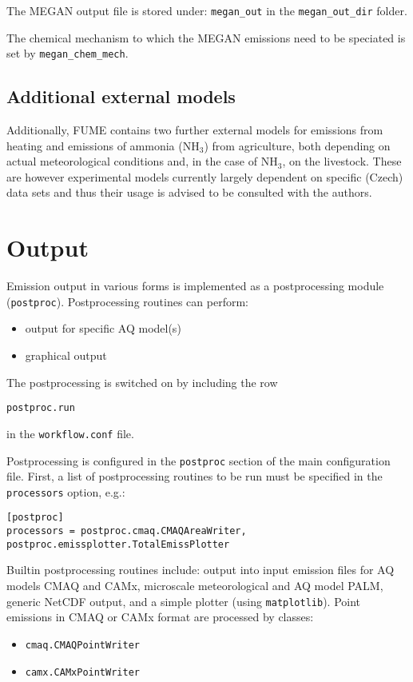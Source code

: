 \documentclass[a4paper,11pt]{article}
\begin{document}
The MEGAN output file is stored under:
\verb|megan_out| in the \verb|megan_out_dir| folder.

The chemical mechanism to which the MEGAN emissions need to be speciated is set by \verb|megan_chem_mech|.

\subsection{Additional external models}
Additionally, FUME contains two further external models for emissions from heating and emissions of ammonia (NH$_3$) from agriculture, both depending on actual meteorological conditions and, in the case of NH$_3$, on the livestock. These are however experimental models currently largely dependent on specific (Czech) data sets and thus their usage is advised to be consulted with the authors.

\section{Output}\label{output}
Emission output in various forms is implemented as a postprocessing
module (\verb|postproc|). Postprocessing routines can perform:
\begin{itemize}
\item output for specific AQ model(s)
\item graphical output
\end{itemize}

The postprocessing is switched on by including the row
\begin{verbatim}
postproc.run 
\end{verbatim}
in the \verb|workflow.conf| file.

Postprocessing is configured in the \verb|postproc| section of the
main configuration file. First, a list of postprocessing routines to be
run must be specified in the \verb|processors| option, e.g.:
\begin{verbatim}
[postproc]
processors = postproc.cmaq.CMAQAreaWriter, postproc.emissplotter.TotalEmissPlotter
\end{verbatim}

Builtin postprocessing routines include: output into input emission
files for AQ models CMAQ and CAMx, microscale meteorological and AQ model PALM, generic NetCDF output, and a simple plotter (using \verb|matplotlib|). Point emissions in CMAQ or CAMx format are processed by classes:
\begin{itemize}
\item
  \verb|cmaq.CMAQPointWriter|
\item
  \verb|camx.CAMxPointWriter|
\end{itemize}
\end{document}
